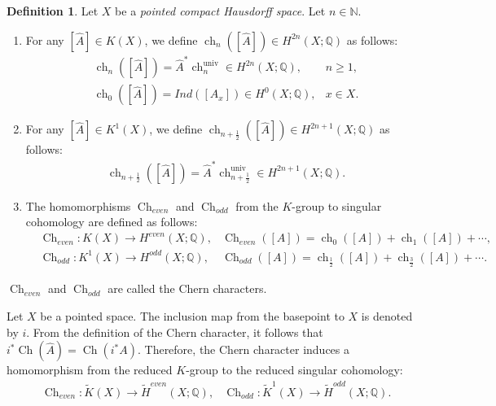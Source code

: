 \documentclass{amsart}
\theoremstyle{definition}
\newtheorem{dfn}[thm]{Definition}
\theoremstyle{remark}
\newcommand{\N}{\mathbb{N}}
\begin{document}
\begin{dfn}\label{dfn:chern-on-X}
Let $X$ be a \emph{pointed compact Hausdorff space}.
Let $n \in \N$.
\begin{enumerate}
\item
For any $[\hat{A}] \in K(X)$, we define $\operatorname{ch}_{n}([\hat{A}]) \in H^{2n}(X;\mathbb{Q})$ as follows:
\begin{align*}
&\operatorname{ch}_n([\hat{A}])=\hat{A}^{*}\operatorname{ch}_n^{\mathrm{univ}} \in H^{2n}(X;\mathbb{Q}), & n\ge 1,\\
&\operatorname{ch}_0([\hat{A}])=Ind([A_x]) \in H^0(X;\mathbb{Q}), &x \in X.
\end{align*}
\item For any $[\hat{A}] \in K^{1}(X)$, we define $\operatorname{ch}_{n+\frac{1}{2}}([\hat{A}]) \in H^{2n+1}(X;\mathbb{Q})$ as follows:
\begin{align*}
&\operatorname{ch}_{n+\frac{1}{2}}([\hat{A}])=\hat{A}^{*}\operatorname{ch}_{n+\frac{1}{2}}^{\mathrm{univ}} \in H^{2n+1}(X;\mathbb{Q}).
\end{align*}
\item The homomorphisms \(\operatorname{Ch}_{even}\) and \(\operatorname{Ch}_{odd}\) from the $K$-group to singular cohomology are defined as follows:
\begin{align*}
&\operatorname{Ch}_{even}\colon K(X)\to H^{even}(X;\mathbb{Q}), &\operatorname{Ch}_{even}([A])=\operatorname{ch}_{0}([A])+\operatorname{ch}_1([A])+\cdots,\\
&\operatorname{Ch}_{odd}\colon K^1(X)\to H^{odd}(X;\mathbb{Q}), &\operatorname{Ch}_{odd}([A])=\operatorname{ch}_{\frac{1}{2}}([A])+\operatorname{ch}_{\frac{3}{2}}([A])+\cdots.
\end{align*}
\end{enumerate}
$\operatorname{Ch}_{even}$ and $\operatorname{Ch}_{odd}$ are called the Chern characters.
\end{dfn}

Let $X$ be a pointed space. The inclusion map from the basepoint to $X$ is denoted by $i$. From the definition of the Chern character, it follows that $i^{*}\operatorname{Ch}(\hat{A}) = \operatorname{Ch}(i^{*}A)$. Therefore, the Chern character induces a homomorphism from the reduced $K$-group to the reduced singular cohomology:
\begin{align*}
&\operatorname{Ch}_{even}\colon \tilde{K}(X)\to \tilde{H}^{even}(X;\mathbb{Q}),&\operatorname{Ch}_{odd}\colon \tilde{K}^1(X)\to \tilde{H}^{odd}(X;\mathbb{Q}).
\end{align*}
\end{document}
